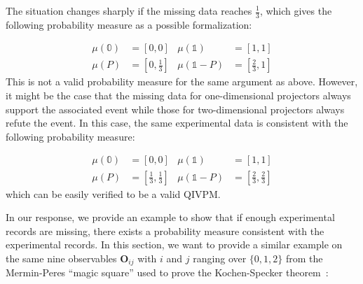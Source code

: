 \documentclass[english,reprint, aps, prl,superscriptaddress, showpacs,
showkeys, longbibliography, amsmath, amssymb, floatfix]{revtex4-1}
\theoremstyle{plain}
\theoremstyle{definition}
\newcommand{\imposs}{\ensuremath{\left[0,0\right]}}
\newcommand{\necess}{\ensuremath{\left[1,1\right]}}
\begin{document}
The situation changes sharply if the missing data reaches $\frac{1}{3}$,
which gives the following probability measure as a possible formalization:

\begin{equation}
\begin{aligned}\mu\left(\mathbb{0}\right) & =\imposs & \mu\left(\mathbb{1}\right) & =\necess\\
\mu\left(P\right) & =\left[0,\tfrac{1}{3}\right] & \mu\left(\mathbb{1}-P\right) & =\left[\tfrac{2}{3},1\right]
\end{aligned}
\end{equation}
This is not a valid probability measure for the same argument as above.
However, it might be the case that the missing data for one-dimensional
projectors always support the associated event while those for two-dimensional
projectors always refute the event. In this case, the same experimental
data is consistent with the following probability measure:

\begin{equation}
\begin{aligned}\mu\left(\mathbb{0}\right) & =\imposs & \mu\left(\mathbb{1}\right) & =\necess\\
\mu\left(P\right) & =\left[\tfrac{1}{3},\tfrac{1}{3}\right] & \mu\left(\mathbb{1}-P\right) & =\left[\tfrac{2}{3},\tfrac{2}{3}\right]
\end{aligned}
\end{equation}
which can be easily verified to be a valid QIVPM.

In our response, we provide an example to show that if enough experimental
records are missing, there exists a probability measure consistent
with the experimental records. In this section, we want to provide
a similar example on the same nine observables $\mathbf{O}_{ij}$
with $i$ and $j$ ranging over $\{0,1,2\}$ from the Mermin-Peres
``magic square'' used to prove the Kochen-Specker theorem~\cite{Mermin1990Simple,peres1995quantum,Griffiths2003}:
\end{document}
